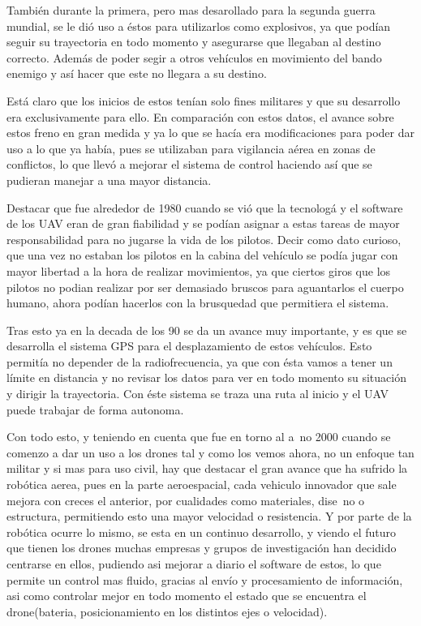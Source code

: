 \hspace{1cm} Tambi\'en durante la primera, pero mas desarollado para la segunda guerra mundial, se le di\'o uso a \'estos para utilizarlos como explosivos, ya que pod\'ian seguir su trayectoria en todo momento y asegurarse que llegaban al destino correcto. Adem\'as de poder segir a otros veh\'iculos en movimiento del bando enemigo y as\'i hacer que este no llegara a su destino. 

\hspace{1cm} Est\'a claro que los inicios de estos ten\'ian solo fines militares y que su desarrollo era exclusivamente para ello. En comparaci\'on con estos datos, el avance sobre estos freno en gran medida y ya lo que se hac\'ia era modificaciones para poder dar uso a lo que ya hab\'ia, pues se utilizaban para vigilancia a\'erea en zonas de conflictos, lo que llev\'o a mejorar el sistema de control haciendo as\'i que se pudieran manejar a una mayor distancia. 

\hspace{1 cm}Destacar que fue alrededor de 1980 cuando se vi\'o que la tecnolog\'a y el software de los UAV eran de gran fiabilidad y se pod\'ian asignar a estas tareas de mayor responsabilidad para no jugarse la vida de los pilotos. Decir como dato curioso, que una vez no estaban los pilotos en la cabina del veh\'iculo se pod\'ia jugar con mayor libertad a la hora de realizar movimientos, ya que ciertos giros que los pilotos no podian realizar por ser demasiado bruscos para aguantarlos el cuerpo humano, ahora pod\'ian hacerlos con la brusquedad que permitiera el sistema.  

\hspace{1 cm} Tras esto ya en la decada de los 90 se da un avance muy importante, y es que se desarrolla el sistema GPS para el desplazamiento de estos veh\'iculos. Esto permit\'ia no depender de la radiofrecuencia, ya que con \'esta vamos a tener un l\'imite en distancia y no revisar los datos para ver en todo momento su situaci\'on y dirigir la trayectoria. Con \'este sistema se traza una ruta al inicio y el UAV puede trabajar de forma autonoma. 

\hspace{1cm} Con todo esto, y teniendo en cuenta que fue en torno al a~no 2000 cuando se comenzo a dar un uso a los drones tal y como los vemos ahora, no un enfoque tan militar y si mas para uso civil, hay que destacar el gran avance que ha sufrido la rob\'otica aerea, pues en la parte aeroespacial, cada vehiculo innovador que sale mejora con creces el anterior, por cualidades como materiales,  dise~no o estructura, permitiendo esto una mayor velocidad o resistencia. Y por parte de la rob\'otica ocurre lo mismo, se esta en un continuo desarrollo, y viendo el futuro que tienen los drones muchas empresas y grupos de investigaci\'on han decidido centrarse en ellos, pudiendo asi mejorar a diario el software de estos, lo que permite un control mas fluido, gracias al env\'io y procesamiento de informaci\'on, asi como controlar mejor en todo momento el estado que se encuentra el drone(bateria, posicionamiento en los distintos ejes o velocidad). 
 




